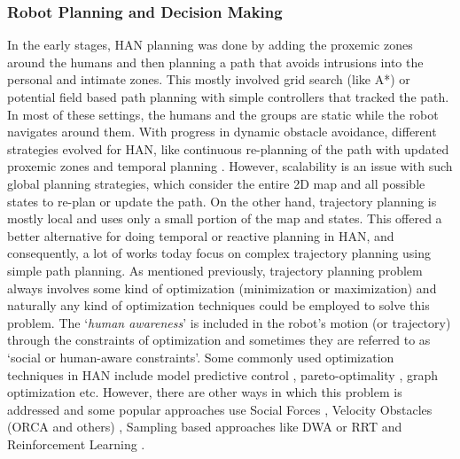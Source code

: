 
\subsubsection{Robot Planning and Decision Making}
In the early stages, HAN planning was done by adding the proxemic zones around the humans and then planning a path that avoids intrusions into the personal and intimate zones. This mostly involved grid search (like A*) or potential field based path planning with simple controllers that tracked the path. In most of these settings, the humans and the groups are static while the robot navigates around them. 
With progress in dynamic obstacle avoidance, different strategies evolved for HAN, like continuous re-planning of the path with updated proxemic zones \cite{truong2014dynamic} and temporal planning \cite{kollmitz2015time}. However, scalability is an issue with such global planning strategies, which consider the entire 2D map and all possible states to re-plan or update the path. On the other hand, trajectory planning is mostly local and uses only a small portion of the map and states. This offered a better alternative for doing temporal or reactive planning in HAN, and consequently, a lot of works today focus on complex trajectory planning using simple path planning. As mentioned previously, trajectory planning problem always involves some kind of optimization (minimization or maximization) and naturally any kind of optimization techniques could be employed to solve this problem. The `\textit{human awareness}' is included in the robot's motion (or trajectory) through the constraints of optimization and sometimes they are referred to as `social or human-aware constraints'. Some commonly used optimization techniques in HAN include model predictive control \cite{rosmann2021online}, pareto-optimality \cite{forer2018socially}, graph optimization \cite{rosmann2013efficient} etc. However, there are other ways in which this problem is addressed and some popular approaches use Social Forces \cite{ferrer2013social}, Velocity Obstacles (ORCA and others) \cite{guzzi2013human}, Sampling based approaches like DWA \cite{fox1997dynamic} or RRT \cite{rios2011understanding} and Reinforcement Learning \cite{chen2017socially}. 

